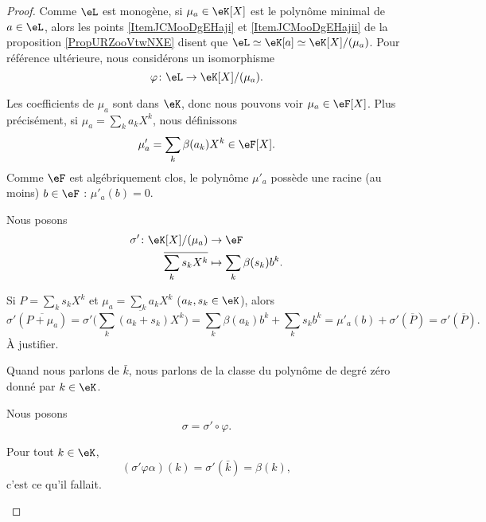 \begin{proof}
	Comme \( \eL\) est monogène, si \( \mu_a\in \eK[X]\) est le polynôme minimal de \( a\in \eL\), alors les points \ref{ItemJCMooDgEHaji} et \ref{ItemJCMooDgEHajii} de la proposition \ref{PropURZooVtwNXE} disent que \( \eL\simeq \eK[a]\simeq \eK[X]/(\mu_a)\). Pour référence ultérieure, nous considérons un isomorphisme
	\begin{equation}
		\varphi\colon \eL\to \eK[X]/(\mu_a).
	\end{equation}

	Les coefficients de \( \mu_a\) sont dans \( \eK\), donc nous pouvons voir \( \mu_a\in \eF[X]\). Plus précisément, si \( \mu_a=\sum_ka_kX^k\), nous définissons
	\begin{equation}
		\mu'_a=\sum_k\beta(a_k)X^k\in \eF[X].
	\end{equation}
	Comme \( \eF\) est algébriquement clos, le polynôme \( \mu'_a\) possède une racine (au moins) \( b\in \eF\) : \( \mu'_a(b)=0\).

	Nous posons
	\begin{equation}
		\begin{aligned}
			\sigma'\colon \eK[X]/(\mu_a) & \to \eF                      \\
			\overline{ \sum_k s_kX^k }   & \mapsto \sum_k\beta(s_k)b^k.
		\end{aligned}
	\end{equation}
	\begin{subproof}
		Si \( P=\sum_ks_kX^k\) et \( \mu_a=\sum_ka_kX^k\) (\( a_k, s_k\in \eK\)), alors
		\begin{equation}
			\sigma'(\overline{ P+\mu_a })=\sigma'\big( \overline{ \sum_k (a_k+s_k)X^k } \big)=\sum_k\beta(a_k)b^k+\sum_ks_kb^k=\mu'_a(b)+\sigma'(\overline{ P })=\sigma'(\overline{ P }).
		\end{equation}
		À justifier.

		\spitem[\( \varphi\big( \alpha(k) \big)=\bar k\)]
		Quand nous parlons de \( \bar k\), nous parlons de la classe du polynôme de degré zéro donné par \( k\in \eK\).

		\spitem[La réponse]
		Nous posons
		\begin{equation}
			\sigma=\sigma'\circ \varphi.
		\end{equation}

		Pour tout \( k\in \eK\),
		\begin{equation}
			(\sigma'\varphi\alpha)(k)=\sigma'(\bar k)=\beta(k),
		\end{equation}
		c'est ce qu'il fallait.
	\end{subproof}
\end{proof}

